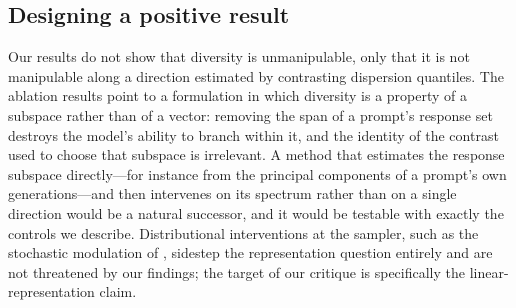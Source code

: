 \subsection{Designing a positive result}
\label{app:positive}


Our results do not show that diversity is unmanipulable, only that it is not manipulable along a
direction estimated by contrasting dispersion quantiles. The ablation results point to a
formulation in which diversity is a property of a subspace rather than of a vector: removing the
span of a prompt's response set destroys the model's ability to branch within it, and the identity
of the contrast used to choose that subspace is irrelevant. A method that estimates the response
subspace directly---for instance from the principal components of a prompt's own generations---and
then intervenes on its spectrum rather than on a single direction would be a natural successor, and
it would be testable with exactly the controls we describe. Distributional interventions at the
sampler, such as the stochastic modulation of \citet{xu2026prism}, sidestep the representation
question entirely and are not threatened by our findings; the target of our critique is specifically
the linear-representation claim.

